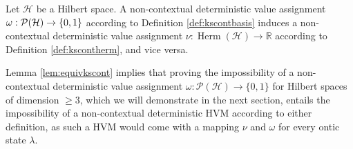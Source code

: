 \begin{lemma}
\label{lem:equivkscont}
Let $\mathcal{H}$ be a Hilbert space. A non-contextual deterministic value assignment $\hfill\break\omega:\mathcal{P}(\mathcal{H})\rightarrow\{0,1\}$ according to Definition \ref{def:kscontbasis} induces a non-contextual deterministic value assignment $\nu:\operatorname{Herm}(\mathcal{H})\rightarrow\mathbb{\mathbb{R}}$ according to Definition \ref{def:kscontherm}, and vice versa.
\end{lemma}

Lemma \ref{lem:equivkscont} implies that proving the impossibility of a non-contextual deterministic value assignment $\omega:\mathcal{P}(\mathcal{H})\rightarrow\{0,1\}$ for Hilbert spaces of dimension $\geq3$, which we will demonstrate in the next section, entails the impossibility of a non-contextual deterministic HVM according to either definition, as such a HVM would come with a mapping $\nu$ and $\omega$ for every ontic state $\lambda$.

